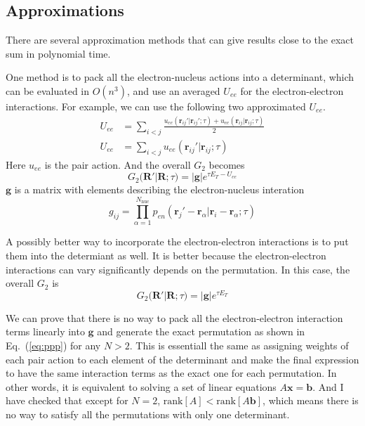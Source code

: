\documentclass[aps,prl,reprint,groupedaddress]{revtex4-1}
\begin{document}
\subsection{Approximations}

There are several approximation methods that can give results close to the exact sum in polynomial time.

One method is to pack all the electron-nucleus actions into a determinant, which can be evaluated in $O(n^3)$, and use an averaged $U_{ee}$ for the electron-electron interactions.
For example, we can use the following two approximated $U_{ee}$.
\begin{align}
U_{ee} & = \sum\limits_{i<j}
\frac{u_{ee}(\bm{r}_{ij}'|\bm{r}_{ij}';\tau) + u_{ee}(\bm{r}_{ij}|\bm{r}_{ij};\tau)}{2}\\
U_{ee} & = \sum\limits_{i<j}u_{ee}(\bm{r}_{ij}'|\bm{r}_{ij};\tau)
\end{align}
Here $u_{ee}$ is the pair action.
And the overall $G_2$ becomes
\begin{equation}
\label{eq:G2pppUee}
G_2(\bm{R'}|\bm{R};\tau) = |\bm{g}|e^{\tau E_T-U_{ee}}
\end{equation}
$\bm{g}$ is a matrix with elements describing the electron-nucleus interation
\begin{equation}
g_{ij} = \prod\limits_{\alpha = 1}^{N_{\mathrm{nuc}}}
p_{en}(\bm{r}_j'-\bm{r}_\alpha|\bm{r}_i-\bm{r}_\alpha;\tau)
\end{equation}

A possibly better way to incorporate the electron-electron interactions is to put them into the determiant as well.
It is better because the electron-electron interactions can vary significantly depends on the permutation.
In this case, the overall $G_2$ is
\begin{equation}
\label{eq:G2pppUee3}
G_2(\bm{R'}|\bm{R};\tau) = |\bm{g}|e^{\tau E_T}
\end{equation}

We can prove that there is no way to pack all the electron-electron interaction terms linearly into $\bm{g}$ and generate the exact permutation as shown in Eq.~(\ref{eq:ppp}) for any $N>2$.
This is essentiall the same as assigning weights of each pair action to each element of the determinant and make the final expression to have the same interaction terms as the exact one for each permutation.
In other words, it is equivalent to solving a set of linear equations $A\bm{x}=\bm{b}$.
And I have checked that except for $N=2$, $\mathrm{rank}[A] < \mathrm{rank}[A \bm{b}]$, which means there is no way to satisfy all the permutations with only one determinant.
\end{document}
